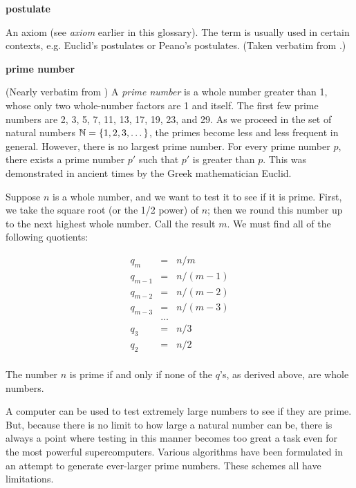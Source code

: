 \begin{vworktermglossaryenum}
\item \textbf{postulate}

      An axiom (see \emph{axiom} earlier in this glossary).  The term is usually
	  used in certain contexts, e.g. Euclid's postulates or Peano's postulates.
	  (Taken verbatim from \cite{bibref:b:penguindictionaryofmathematics:2ded}.)

\item \textbf{prime number}

      (Nearly verbatim from \cite{bibref:w:wwwwhatiscom}) A \emph{prime number}
      is a whole number greater than 1, whose only two whole-number 
      factors are 1 and itself.  The first few prime numbers are 
      2, 3, 5, 7, 11, 13, 17, 19, 23, and 29.  As we proceed in the set of 
      natural numbers ${\mathbb{N}}{} = \{ 1, 2, 3, \ldots{} \} $, the 
      primes become less and less frequent in general.  
      However, there is no largest prime number.  
      For every prime number $p$, there exists a prime number $p'$ such that 
      $p'$ is greater than $p$.  This was demonstrated in ancient times by the 
      Greek mathematician Euclid.%

      Suppose $n$ is a whole number, and we want to test it to see if it is prime.   
      First, we take the square root (or the 1/2 power) of $n$; then we round this 
      number up to the next highest whole number.  Call the result $m$.  
      We must find all of the following quotients:

      \begin{equation}
      \begin{array}{rcl}
         q_m     & =        & n / m              \\
         q_{m-1} & =        & n / (m-1)          \\
         q_{m-2} & =        & n / (m-2)          \\
         q_{m-3} & =        & n / (m-3)          \\
                 & \ldots{} &                    \\
         q_3     & =        & n / 3              \\
         q_2     & =        & n / 2              \\
      \end{array}
      \end{equation}

      The number $n$ is prime if and only if none of the $q$'s, as 
      derived above, are whole numbers.

      A computer can be used to test extremely large numbers to see if they are prime.  
      But, because there is no limit to how large a natural number can be, 
      there is always a point where testing in this manner becomes too great 
      a task even for the most powerful supercomputers.  
      Various algorithms have been formulated in an attempt to generate 
      ever-larger prime numbers.  These schemes all have limitations.

\end{vworktermglossaryenum}


